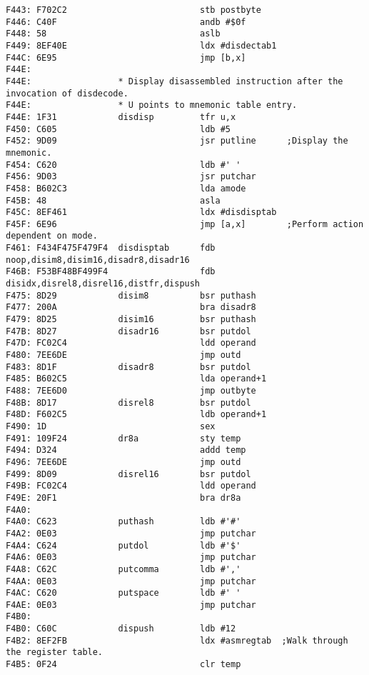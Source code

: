 {\begin{verbatim}
F443: F702C2                          stb postbyte    
F446: C40F                            andb #$0f
F448: 58                              aslb
F449: 8EF40E                          ldx #disdectab1
F44C: 6E95                            jmp [b,x]
F44E:                 
F44E:                 * Display disassembled instruction after the invocation of disdecode.
F44E:                 * U points to mnemonic table entry.
F44E: 1F31            disdisp         tfr u,x
F450: C605                            ldb #5
F452: 9D09                            jsr putline      ;Display the mnemonic.
F454: C620                            ldb #' '
F456: 9D03                            jsr putchar
F458: B602C3                          lda amode
F45B: 48                              asla
F45C: 8EF461                          ldx #disdisptab
F45F: 6E96                            jmp [a,x]        ;Perform action dependent on mode.
F461: F434F475F479F4  disdisptab      fdb noop,disim8,disim16,disadr8,disadr16
F46B: F53BF48BF499F4                  fdb disidx,disrel8,disrel16,distfr,dispush
F475: 8D29            disim8          bsr puthash
F477: 200A                            bra disadr8
F479: 8D25            disim16         bsr puthash
F47B: 8D27            disadr16        bsr putdol
F47D: FC02C4                          ldd operand
F480: 7EE6DE                          jmp outd
F483: 8D1F            disadr8         bsr putdol
F485: B602C5                          lda operand+1
F488: 7EE6D0                          jmp outbyte
F48B: 8D17            disrel8         bsr putdol
F48D: F602C5                          ldb operand+1
F490: 1D                              sex
F491: 109F24          dr8a            sty temp
F494: D324                            addd temp
F496: 7EE6DE                          jmp outd
F499: 8D09            disrel16        bsr putdol
F49B: FC02C4                          ldd operand
F49E: 20F1                            bra dr8a
F4A0:                                 
F4A0: C623            puthash         ldb #'#'
F4A2: 0E03                            jmp putchar
F4A4: C624            putdol          ldb #'$'
F4A6: 0E03                            jmp putchar                                                 
F4A8: C62C            putcomma        ldb #','
F4AA: 0E03                            jmp putchar
F4AC: C620            putspace        ldb #' '
F4AE: 0E03                            jmp putchar
F4B0:                 
F4B0: C60C            dispush         ldb #12
F4B2: 8EF2FB                          ldx #asmregtab  ;Walk through the register table.
F4B5: 0F24                            clr temp

\end{verbatim}}
